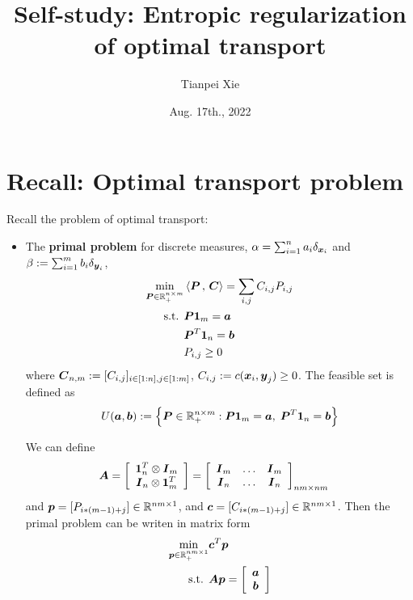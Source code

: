 \documentclass[11pt]{article}
\begin{document}
\title{Self-study: Entropic regularization of optimal transport}
\author{ Tianpei Xie}
\date{ Aug. 17th., 2022 }
\maketitle
\tableofcontents
\newpage
\section{Recall: Optimal transport problem}
Recall the problem of optimal transport:
\begin{itemize}
\item The \textbf{primal problem} for discrete measures, $\alpha = \sum_{i=1}^{n}a_i \delta_{\boldsymbol{x}_{i}}$ and $\beta := \sum_{i=1}^{m}b_i \delta_{\boldsymbol{y}_{i}}$, 
\begin{align}
\min_{\boldsymbol{P} \in {\mathbb R}_{+}^{n \times m}} & \left\langle \boldsymbol{P}\,,\, \boldsymbol{C} \right\rangle = \sum_{i,j}C_{i,j} P_{i,j} \label{eqn: optimal_transport_primal}\\
\text{s.t. }&  \boldsymbol{P}\boldsymbol{1}_{m} = \boldsymbol{a} \nonumber\\
&\boldsymbol{P}^{T}\boldsymbol{1}_{n} = \boldsymbol{b}   \nonumber \\
&P_{i,j} \ge 0 \nonumber
\end{align} where $\boldsymbol{C}_{n,m} := [C_{i,j}]_{i\in [1:n], j\in [1:m]}$,  $C_{i,j}:= c(\boldsymbol{x}_i, \boldsymbol{y}_j) \ge 0$. The feasible set is defined as
\begin{align}
U(\boldsymbol{a}, \boldsymbol{b}) := \left\{\boldsymbol{P} \in {\mathbb R}_{+}^{n \times m}: \boldsymbol{P}\boldsymbol{1}_{m} = \boldsymbol{a},\;\boldsymbol{P}^{T}\boldsymbol{1}_{n} = \boldsymbol{b}\right\} \label{eqn: optimal_transport_feasible_set}
\end{align}

We can define 
\begin{align*}\boldsymbol{A} &= \left[
\begin{array}{c}
\boldsymbol{1}_{n}^{T}\otimes \boldsymbol{I}_{m} \\
\boldsymbol{I}_{n}\otimes  \boldsymbol{1}_{m}^{T}
\end{array}\right] 
=  \left[
\begin{array}{ccc}
 \boldsymbol{I}_{m}& \ldots & \boldsymbol{I}_{m}\\
 \boldsymbol{I}_{n} &  \ldots &\boldsymbol{I}_{n}
\end{array}
\right]_{nm \times nm}
\end{align*} and $\boldsymbol{p} = [P_{i*(m-1)+j}] \in {\mathbb R}^{nm \times 1}$, and $\boldsymbol{c} = [C_{i*(m-1)+j}] \in {\mathbb R}^{nm \times 1}$.
Then the primal problem can be writen in matrix form
\begin{align}
\min_{\boldsymbol{p} \in {\mathbb R}_{+}^{nm \times 1}} & \boldsymbol{c}^{T}\boldsymbol{p} \label{eqn: optimal_transport_primal_mat}\\
\text{s.t. }&  \boldsymbol{A}\boldsymbol{p} = \left[
\begin{array}{c}
\boldsymbol{a} \\
\boldsymbol{b}
\end{array}\right]  \nonumber
\end{align}


\end{itemize}
\end{document}
